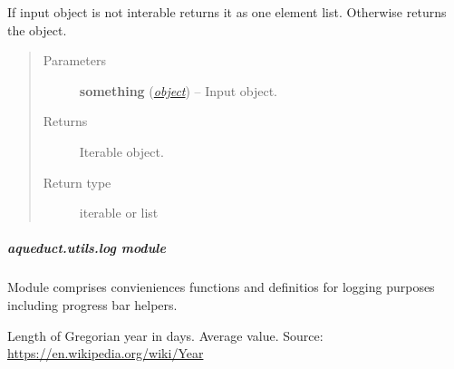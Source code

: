 \documentclass[a4paper,10pt,english]{sphinxmanual}
\begin{document}

\begin{fulllineitems}
\label{aqueduct.utils.helpers:aqueduct.utils.helpers.make_iterable}
If input object is not interable returns it as one element list. Otherwise returns the object.
\begin{quote}\begin{description}
\item[{Parameters}] \leavevmode
\textbf{something} (\href{http://docs.python.org/2/library/functions.html\#object}{\emph{object}}) -- Input object.

\item[{Returns}] \leavevmode
Iterable object.

\item[{Return type}] \leavevmode
iterable or list

\end{description}\end{quote}

\end{fulllineitems}



\subparagraph{aqueduct.utils.log module}
\label{aqueduct.utils.log::doc}\label{aqueduct.utils.log:module-aqueduct.utils.log}\label{aqueduct.utils.log:aqueduct-utils-log-module}
Module comprises convieniences functions and definitios for logging
purposes including progress bar helpers.

\begin{fulllineitems}
\label{aqueduct.utils.log:aqueduct.utils.log.gregorian_year_in_days}
Length of Gregorian year in days. Average value. Source: \href{https://en.wikipedia.org/wiki/Year}{https://en.wikipedia.org/wiki/Year}

\end{fulllineitems}

\end{document}

